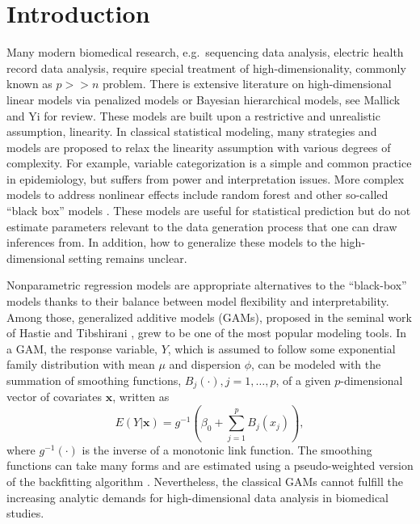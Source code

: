 \documentclass[AMA,STIX1COL,]{WileyNJD-v2}
\begin{document}
\pgfplotsset{compat=1.18}
\usetikzlibrary{shapes.geometric, arrows, positioning, calc, matrix, backgrounds, fit}
\newcommand{\bs}[1]{\boldsymbol{#1}}
\newcommand{\tp}{*}
\newcommand{\pr}{\text{Pr}}
\newcommand{\repa}{\text{repa}}
\newcommand{\simiid}{\overset{\text{iid}}{\sim}}
\newcommand{\bg}[1]{\textcolor{red}{#1}}

\section{Introduction}
\label{sec:intro}

Many modern biomedical research, e.g.~sequencing data analysis, electric
health record data analysis, require special treatment of
high-dimensionality, commonly known as \(p >> n\) problem. There is
extensive literature on high-dimensional linear models via penalized
models or Bayesian hierarchical models, see Mallick and Yi
\citep{Mallick2013} for review. These models are built upon a
restrictive and unrealistic assumption, linearity. In classical
statistical modeling, many strategies and models are proposed to relax
the linearity assumption with various degrees of complexity. For
example, variable categorization is a simple and common practice in
epidemiology, but suffers from power and interpretation issues. More
complex models to address nonlinear effects include random forest and
other so-called ``black box'' models \citep{Breiman2001}. These models
are useful for statistical prediction but do not estimate parameters
relevant to the data generation process that one can draw inferences
from. In addition, how to generalize these models to the
high-dimensional setting remains unclear.

Nonparametric regression models are appropriate alternatives to the
``black-box'' models thanks to their balance between model flexibility
and interpretability. Among those, generalized additive models (GAMs),
proposed in the seminal work of Hastie and Tibshirani
\citep{Hastie1987}, grew to be one of the most popular modeling tools.
In a GAM, the response variable, \(Y\), which is assumed to follow some
exponential family distribution with mean \(\mu\) and dispersion
\(\phi\), can be modeled with the summation of smoothing functions,
\(B_j(\cdot), j = 1, \dots, p\), of a given \(p\)-dimensional vector of
covariates \(\boldsymbol{x}\), written as \[
 E(Y|\boldsymbol{x}) = g^{-1}(\beta_0 + \sum\limits^p_{j=1}B_j(x_j)),
\] where \(g^{-1}(\cdot)\) is the inverse of a monotonic link function.
The smoothing functions can take many forms and are estimated using a
pseudo-weighted version of the backfitting algorithm
\citep{Breiman1985}. Nevertheless, the classical GAMs cannot fulfill the
increasing analytic demands for high-dimensional data analysis in
biomedical studies.
\end{document}

